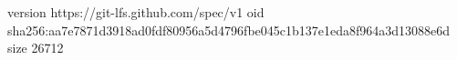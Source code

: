 version https://git-lfs.github.com/spec/v1
oid sha256:aa7e7871d3918ad0fdf80956a5d4796fbe045c1b137e1eda8f964a3d13088e6d
size 26712
